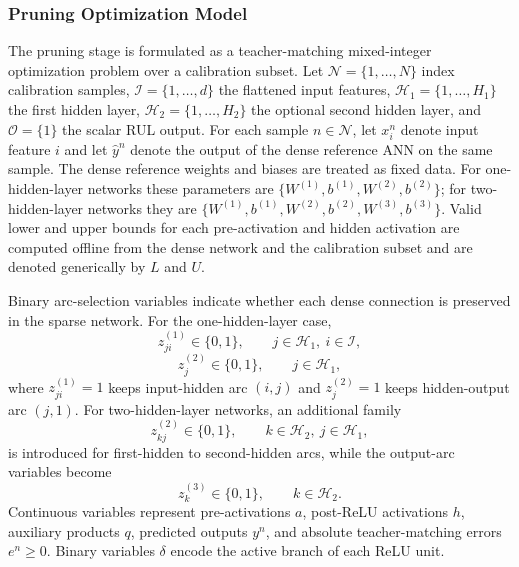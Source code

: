 \subsubsection{Pruning Optimization Model}
The pruning stage is formulated as a teacher-matching mixed-integer optimization problem over a calibration subset. Let $\mathcal{N}=\{1,\dots,N\}$ index calibration samples, $\mathcal{I}=\{1,\dots,d\}$ the flattened input features, $\mathcal{H}_1=\{1,\dots,H_1\}$ the first hidden layer, $\mathcal{H}_2=\{1,\dots,H_2\}$ the optional second hidden layer, and $\mathcal{O}=\{1\}$ the scalar RUL output. For each sample $n\in\mathcal{N}$, let $x_i^n$ denote input feature $i$ and let $\hat{y}^n$ denote the output of the dense reference ANN on the same sample. The dense reference weights and biases are treated as fixed data. For one-hidden-layer networks these parameters are $\{W^{(1)},b^{(1)},W^{(2)},b^{(2)}\}$; for two-hidden-layer networks they are $\{W^{(1)},b^{(1)},W^{(2)},b^{(2)},W^{(3)},b^{(3)}\}$. Valid lower and upper bounds for each pre-activation and hidden activation are computed offline from the dense network and the calibration subset and are denoted generically by $L$ and $U$.

Binary arc-selection variables indicate whether each dense connection is preserved in the sparse network. For the one-hidden-layer case,
\begin{equation}
    z_{ji}^{(1)} \in \{0,1\}, \qquad j\in\mathcal{H}_1,\ i\in\mathcal{I},
\end{equation}
\begin{equation}
    z_{j}^{(2)} \in \{0,1\}, \qquad j\in\mathcal{H}_1,
\end{equation}
where $z_{ji}^{(1)}=1$ keeps input-hidden arc $(i,j)$ and $z_j^{(2)}=1$ keeps hidden-output arc $(j,1)$. For two-hidden-layer networks, an additional family
\begin{equation}
    z_{kj}^{(2)} \in \{0,1\}, \qquad k\in\mathcal{H}_2,\ j\in\mathcal{H}_1,
\end{equation}
is introduced for first-hidden to second-hidden arcs, while the output-arc variables become
\begin{equation}
    z_{k}^{(3)} \in \{0,1\}, \qquad k\in\mathcal{H}_2.
\end{equation}
Continuous variables represent pre-activations $a$, post-ReLU activations $h$, auxiliary products $q$, predicted outputs $y^n$, and absolute teacher-matching errors $e^n\ge 0$. Binary variables $\delta$ encode the active branch of each ReLU unit.

